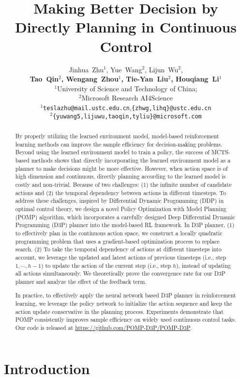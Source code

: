 \documentclass{article}
\title{Making Better Decision by  Directly Planning  in Continuous Control}
\author{Jinhua~Zhu$^1$, Yue~Wang$^2$, Lijun~Wu$^2$,\\
\textbf{Tao~Qin$^2$, Wengang~Zhou$^1$, Tie-Yan~Liu$^2$, Houqiang~Li$^1$}\\
$^1$University of Science and Technology of China; \\
$^2$Microsoft Research AI4Science\\
$^1$\texttt{teslazhu@mail.ustc.edu.cn},\;\texttt{\{zhwg,lihq\}@ustc.edu.cn}\\
$^2$\texttt{\{yuwang5,lijuwu,taoqin,tyliu\}@microsoft.com}\\
}
\begin{document}
\maketitle

\begin{abstract}
 

By properly utilizing the learned environment model, model-based reinforcement learning methods can improve the sample efficiency for decision-making problems.
Beyond using the learned environment model to train a policy, the success of MCTS-based methods shows that directly incorporating the learned environment model as a planner to make decisions might be more effective. 
However, when action space is of high dimension and continuous, directly planning according to the learned model is costly and non-trivial. Because of two challenges: (1) the infinite number of candidate actions and (2) the temporal dependency between actions in different timesteps.
To address these challenges, inspired by Differential Dynamic Programming (DDP) in optimal control theory, we design a novel Policy Optimization with Model Planning (POMP) algorithm, which incorporates a carefully designed Deep Differential Dynamic Programming (D3P) planner into the model-based RL framework. 
 In D3P planner, (1) to effectively plan in the continuous action space, we construct a locally quadratic programming problem that uses a gradient-based optimization process to replace search. (2) To take the temporal dependency of actions at different timesteps into account, we leverage the updated and latest actions of previous timesteps (i.e., step $1, \cdots, h-1$) to update the action of the current step (i.e., step $h$),   instead of updating all actions simultaneously. We  theoretically prove the convergence rate for our D3P planner and analyze the effect of the feedback term.

In practice, to effectively apply the neural network based D3P planner in reinforcement learning, we leverage the policy network to   initialize   the action sequence and keep the action update conservative in the planning process. 
Experiments demonstrate that POMP consistently improves sample efficiency on widely used continuous control tasks. Our code is released at   \url{https://github.com/POMP-D3P/POMP-D3P}. 

\end{abstract}
\section{Introduction}
\end{document}
